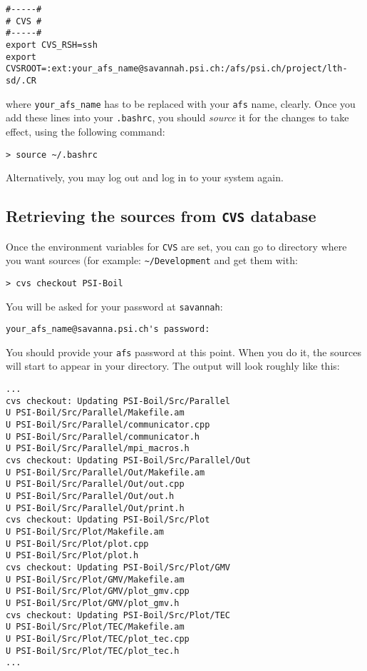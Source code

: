 \begin{verbatim}
#-----#
# CVS #
#-----#
export CVS_RSH=ssh
export CVSROOT=:ext:your_afs_name@savannah.psi.ch:/afs/psi.ch/project/lth-sd/.CR
\end{verbatim}

where {\tt your\_afs\_name} has to be replaced with your {\tt afs} name, clearly. 
Once you add these lines into your {\tt .bashrc}, you should {\em source} it for 
the changes to take effect, using the following command:

\begin{verbatim}
> source ~/.bashrc
\end{verbatim}

Alternatively, you may log out and log in to your system again. 

\subsection{Retrieving the sources from {\tt CVS} database}

Once the environment variables for {\tt CVS} are set, you can go to directory
where you want {\psiboil} sources (for example: \verb"~"{\tt /Development} and get 
them with:

\begin{verbatim}
> cvs checkout PSI-Boil
\end{verbatim}

You will be asked for your password at {\tt savannah}:

\begin{verbatim}
your_afs_name@savanna.psi.ch's password:
\end{verbatim}

You should provide your {\tt afs} password at this point. When you do it, the
sources will start to appear in your directory. The output will look roughly 
like this:

{\small \begin{verbatim}
...
cvs checkout: Updating PSI-Boil/Src/Parallel
U PSI-Boil/Src/Parallel/Makefile.am
U PSI-Boil/Src/Parallel/communicator.cpp
U PSI-Boil/Src/Parallel/communicator.h
U PSI-Boil/Src/Parallel/mpi_macros.h
cvs checkout: Updating PSI-Boil/Src/Parallel/Out
U PSI-Boil/Src/Parallel/Out/Makefile.am
U PSI-Boil/Src/Parallel/Out/out.cpp
U PSI-Boil/Src/Parallel/Out/out.h
U PSI-Boil/Src/Parallel/Out/print.h
cvs checkout: Updating PSI-Boil/Src/Plot
U PSI-Boil/Src/Plot/Makefile.am
U PSI-Boil/Src/Plot/plot.cpp
U PSI-Boil/Src/Plot/plot.h
cvs checkout: Updating PSI-Boil/Src/Plot/GMV
U PSI-Boil/Src/Plot/GMV/Makefile.am
U PSI-Boil/Src/Plot/GMV/plot_gmv.cpp
U PSI-Boil/Src/Plot/GMV/plot_gmv.h
cvs checkout: Updating PSI-Boil/Src/Plot/TEC
U PSI-Boil/Src/Plot/TEC/Makefile.am
U PSI-Boil/Src/Plot/TEC/plot_tec.cpp
U PSI-Boil/Src/Plot/TEC/plot_tec.h
...
\end{verbatim}}

